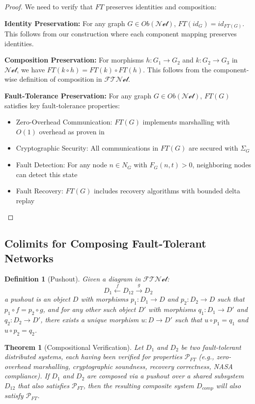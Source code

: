 \documentclass{article}
\newtheorem{theorem}{Theorem}
\newtheorem{definition}{Definition}
\begin{document}
\begin{proof}
We need to verify that $FT$ preserves identities and composition:

\textbf{Identity Preservation:} For any graph $G \in Ob(\mathcal{Net})$, $FT(id_G) = id_{FT(G)}$. This follows from our construction where each component mapping preserves identities.

\textbf{Composition Preservation:} For morphisms $h: G_1 \to G_2$ and $k: G_2 \to G_3$ in $\mathcal{Net}$, we have $FT(k \circ h) = FT(k) \circ FT(h)$. This follows from the component-wise definition of composition in $\mathcal{FTNet}$.

\textbf{Fault-Tolerance Preservation:} For any graph $G \in Ob(\mathcal{Net})$, $FT(G)$ satisfies key fault-tolerance properties:

\begin{itemize}
\item Zero-Overhead Communication: $FT(G)$ implements marshalling with $O(1)$ overhead as proven in \cite{obinexus2025marshalling}
\item Cryptographic Security: All communications in $FT(G)$ are secured with $\Sigma_G$
\item Fault Detection: For any node $n \in N_G$ with $F_G(n, t) > 0$, neighboring nodes can detect this state
\item Fault Recovery: $FT(G)$ includes recovery algorithms with bounded delta replay
\end{itemize}
\end{proof}

\subsection{Colimits for Composing Fault-Tolerant Networks}

\begin{definition}[Pushout]
Given a diagram in $\mathcal{FTNet}$:
$$D_1 \xleftarrow{f} D_{12} \xrightarrow{g} D_2$$
a pushout is an object $D$ with morphisms $p_1: D_1 \to D$ and $p_2: D_2 \to D$ such that $p_1 \circ f = p_2 \circ g$, and for any other such object $D'$ with morphisms $q_1: D_1 \to D'$ and $q_2: D_2 \to D'$, there exists a unique morphism $u: D \to D'$ such that $u \circ p_1 = q_1$ and $u \circ p_2 = q_2$.
\end{definition}

\begin{theorem}[Compositional Verification]
Let $D_1$ and $D_2$ be two fault-tolerant distributed systems, each having been verified for properties $\mathcal{P}_{FT}$ (e.g., zero-overhead marshalling, cryptographic soundness, recovery correctness, NASA compliance). If $D_1$ and $D_2$ are composed via a pushout over a shared subsystem $D_{12}$ that also satisfies $\mathcal{P}_{FT}$, then the resulting composite system $D_{comp}$ will also satisfy $\mathcal{P}_{FT}$.
\end{theorem}
\end{document}
